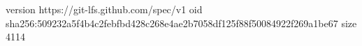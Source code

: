 version https://git-lfs.github.com/spec/v1
oid sha256:509232a5f4b4c2febfbd428c268e4ae2b7058df125f88f50084922f269a1be67
size 4114
